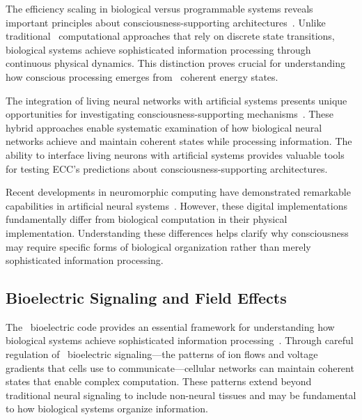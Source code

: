 The efficiency scaling in biological versus programmable systems reveals important principles about consciousness-supporting architectures~\cite{Conrad1995, anderson2024physical}. Unlike traditional~ computational approaches that rely on discrete state transitions, biological systems achieve sophisticated information processing through~ continuous physical dynamics. This distinction proves crucial for understanding how conscious processing emerges from~ coherent energy states.

The integration of living neural networks with artificial systems presents unique opportunities for investigating consciousness-supporting mechanisms~\cite{DeMarse2005, pinotsis2023vivo}. These hybrid approaches enable systematic examination of how biological neural networks achieve and maintain coherent states while processing information. The ability to interface living neurons with artificial systems provides valuable tools for testing ECC's predictions about consciousness-supporting architectures.

Recent developments in neuromorphic computing have demonstrated remarkable capabilities in artificial neural systems~\cite{Merolla2014, seth2024conscious}. However, these digital implementations fundamentally differ from biological computation in their physical implementation. Understanding these differences helps clarify why consciousness may require specific forms of biological organization rather than merely sophisticated information processing.

\subsection*{Bioelectric Signaling and Field Effects}

The~ bioelectric code provides an essential framework for understanding how biological systems achieve sophisticated information processing~\cite{Levin2018, levin2020revisiting}. Through careful regulation of~ bioelectric signaling—the patterns of ion flows and voltage gradients that cells use to communicate—cellular networks can maintain coherent states that enable complex computation. These patterns extend beyond traditional neural signaling to include non-neural tissues and may be fundamental to how biological systems organize information.

